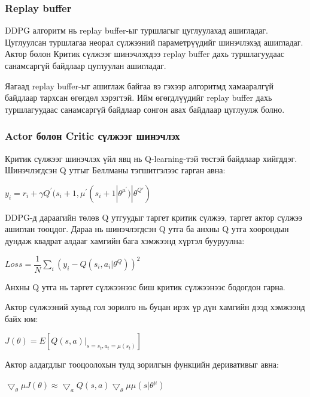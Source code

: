 \documentclass[12pt,A4]{report}
\begin{document}
\subsubsection{Replay buffer}

DDPG алгоритм нь replay buffer-ыг туршлагыг цуглуулахад ашигладаг. Цуглуулсан туршлагаа неорал сүлжээний параметрүүдийг шинэчлэхэд ашигладаг. Актор болон Критик сүлжээг шинэчлэхдээ replay buffer дахь туршлагуудаас санамсаргүй байдлаар цуглуулан ашигладаг.

Яагаад replay buffer-ыг ашиглаж байгаа вэ гэхээр алгоритмд хамааралгүй байдлаар тархсан өгөгдөл хэрэгтэй. Ийм өгөгдлүүдийг replay buffer дахь туршлагуудаас санамсаргүй байдлаар сонгон авах байдлаар цуглуулж болно.

\subsubsection{Actor болон Critic сүлжээг шинэчлэх}

Критик сүлжээг шинэчлэх үйл явц нь Q-learning-тэй төстэй байдлаар хийгддэг. Шинэчлэгдсэн Q утгыг Беллманы тэгшитгэлээс гарган авна:

\begin{center}
$y_i=r_i+\gamma{Q^{'}}(s_i+1,\mu^{'}(s_i+1|\theta^{\mu^{'}})|\theta^{Q{'}})$
\end{center}

DDPG-д дараагийн төлөв Q утгуудыг таргет критик сүлжээ, таргет актор сүлжээ ашиглан тооцдог. Дараа нь шинэчлэгдсэн Q утга ба анхны Q утга хоорондын дундаж квадрат алдааг хамгийн бага хэмжээнд хүртэл бууруулна:

\begin{center}
$Loss = \dfrac{1}{N}\sum_{i}(y_i-Q(s_i,a_i|\theta^Q))^2$
\end{center}

Анхны Q утга нь таргет сүлжээнээс биш критик сүлжээнээс бодогдон гарна. 

Актор сүлжээний хувьд гол зорилго нь буцан ирэх үр дүн хамгийн дээд хэмжээнд байх юм:

\begin{center}
$J(\theta) = E[Q(s, a)|_{s=s_t,a_t=\mu(s_t)}]$
\end{center}

Актор алдагдлыг тооцоолохын тулд зорилгын функцийн деривативыг авна:

\begin{center}
$\bigtriangledown_\theta\mu J(\theta) \approx \bigtriangledown_a Q(s, a)\bigtriangledown_\theta\mu \mu(s|\theta^\mu)$
\end{center}
\end{document}
